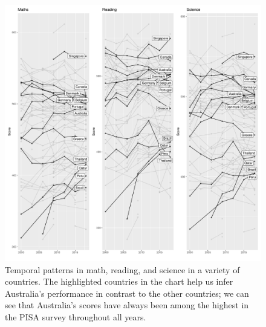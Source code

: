 \begin{figure}[H]
\includegraphics[width=1\linewidth]{learningtower_files/figure-latex/bs-plot-1} \caption{Temporal patterns in math, reading, and science in a variety of countries. The highlighted countries in the chart help us infer Australia's performance in contrast to the other countries; we can see that Australia's scores have always been among the highest in the PISA survey throughout all years.}\label{fig:bs-plot}
\end{figure}


